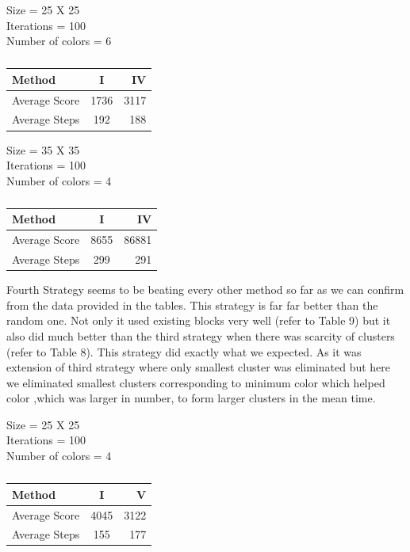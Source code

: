\documentclass[twoside]{article}
\begin{document}
\begin{multicols}{2}
\begin{table}[H]
\caption{}
Size = 25 X 25	\\
Iterations = 100\\
Number of colors = 6	\\
\centering
\begin{tabular}{l | c| r}
\toprule
Method & I & IV \\
\hline
Average Score & 1736 & 3117 \\
\hline
Average Steps & 192 & 188 \\
\hline
\bottomrule
\end{tabular}

\end{table}
\begin{table}[H]
\caption{}
Size = 35 X 35	\\
Iterations = 100\\
Number of colors = 4	\\
\centering
\begin{tabular}{l | c| r}
\toprule
Method & I & IV \\
\hline
Average Score & 8655 & 86881 \\
\hline
Average Steps & 299 & 291 \\
\hline
\bottomrule
\end{tabular}
\end{table}

Fourth Strategy seems to be beating every other method so far as we can confirm from the data provided in the tables. This strategy 
is far far better than the random one. Not only it used existing blocks very well (refer to Table 9) but it also did much better 
than the third strategy when there was scarcity of clusters (refer to Table 8). This strategy did exactly what we expected. As it was extension of 
third strategy where only smallest cluster was eliminated but here we eliminated smallest clusters corresponding to minimum color
which helped color ,which was larger in number, to form larger clusters in the mean time.

\begin{table}[H]
\caption{}
Size = 25 X 25	\\
Iterations = 100\\
Number of colors = 4	\\
\centering
\begin{tabular}{l | c| r}
\toprule
Method & I & V \\
\hline
Average Score & 4045 & 3122 \\
\hline
Average Steps & 155 & 177 \\
\hline
\bottomrule
\end{tabular}
\end{table}


\end{multicols}
\end{document}
